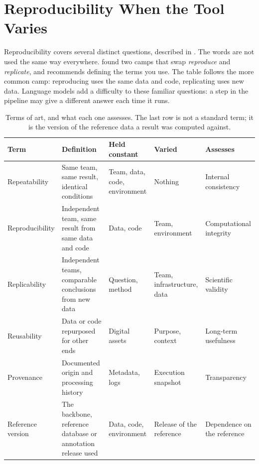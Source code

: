 \chapter{Reproducibility When the Tool Varies}
\label{ch:reproducibility}

Reproducibility covers several distinct questions, described in
. The words are not used the same way everywhere.
\textcite{barba2018terminologies} found two camps that swap
\emph{reproduce} and \emph{replicate}, and recommends defining the terms you
use. The table follows the more common camp: reproducing uses the same data
and code, replicating uses new data. Language models add a difficulty to these
familiar questions: a step in the pipeline may give a different answer each
time it runs.

\begin{table}[htbp]
\centering
\caption{Terms of art, and what each one assesses. The last row is not a
standard term; it is the version of the reference data a result was computed
against.}
\label{tab:reproducibility}
\footnotesize
\begin{tabularx}{\textwidth}{lXXXX}
\toprule
\textbf{Term} & \textbf{Definition} & \textbf{Held constant} & \textbf{Varied} & \textbf{Assesses} \\
\midrule
Repeatability & Same team, same result, identical conditions & Team, data, code, environment & Nothing & Internal consistency \\
\addlinespace
Reproducibility & Independent team, same result from same data and code & Data, code & Team, environment & Computational integrity \\
\addlinespace
Replicability & Independent teams, comparable conclusions from new data & Question, method & Team, infrastructure, data & Scientific validity \\
\addlinespace
Reusability & Data or code repurposed for other ends & Digital assets & Purpose, context & Long-term usefulness \\
\addlinespace
Provenance & Documented origin and processing history & Metadata, logs & Execution snapshot & Transparency \\
\addlinespace
Reference version & The backbone, reference database or annotation release used & Data, code, environment & Release of the reference & Dependence on the reference \\
\bottomrule
\end{tabularx}
\end{table}

